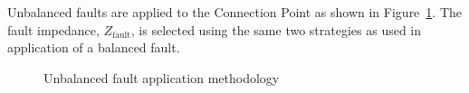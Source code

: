 Unbalanced faults are applied to the Connection Point as shown in Figure~\ref{fig:unbalanced-fault-diagram}. The fault impedance, $Z_{\text{fault}}$, is selected using the same two strategies as used in application of a balanced fault. 

\begin{figure}[h]
	\centering
	
	\caption{Unbalanced fault application methodology}
	\label{fig:unbalanced-fault-diagram}
\end{figure}